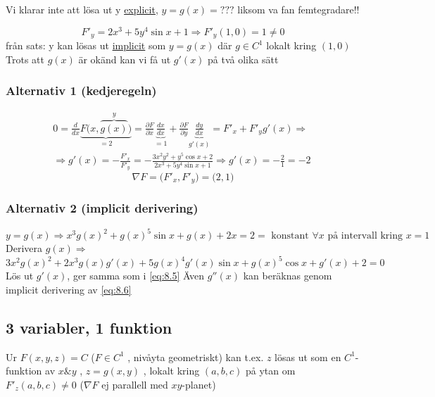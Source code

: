 \documentclass{article}
\begin{document}
Vi klarar inte att lösa ut y \underline{explicit}, \(y = g(x) = ???\) liksom va fan femtegradare!!

\[F'_y = 2x^3 + 5y^4\sin{x} + 1 \Rightarrow F'_y(1,0) = 1 \neq 0\]
från sats: y kan lösas ut \underline{implicit} som \(y = g(x)\) där \(g \in C^1\) lokalt kring \((1,0)\)
Trots att \(g(x)\) är okänd kan vi få ut \(g'(x)\) på två olika sätt

\subsubsection*{Alternativ 1 (kedjeregeln)}
\begin{equation}\label{eq:8.5}
\begin{split}
	0 = \frac{d}{dx} \underbrace{F\Big(x,\overbrace{g(x)}^y\Big)}_{=2} = \frac{\partial F}{\partial x} \underbrace{\frac{dx}{dx}}_{=1} + \frac{\partial F}{\partial y} \underbrace{\frac{dy}{dx}}_{g'(x)} = F'_x + F'_yg'(x)  \Rightarrow \\
	\Rightarrow g'(x) = - \frac{F'_x}{F'_y} = - \frac{3x^2y^2 + y^5\cos{x} + 2}{2x^3 + 5y^4\sin{x} + 1} \Rightarrow g'(x) = - \frac{2}{1} = -2 \
\end{split}
\end{equation}
\[\nabla F = \Big( F'_x,F'_y \Big) = \Big(2,1\Big)\]

\subsubsection*{Alternativ 2 (implicit derivering)}
\[
	y = g(x) \Rightarrow x^3g(x)^2 + g(x)^5\sin{x} + g(x) + 2x = 2 = \text{ konstant } \forall x \text{ på intervall kring } x = 1
\]
Derivera \(g(x) \Rightarrow\)
\begin{equation} \label{eq:8.6}
	3x^2g(x)^2 + 2x^3g(x)g'(x) + 5g(x)^4g'(x)\sin{x} + g(x)^5\cos{x} + g'(x) + 2 = 0 
\end{equation}
Lös ut \(g'(x)\), ger samma som i \eqref{eq:8.5} Även \(g''(x)\) kan beräknas genom implicit derivering av \eqref{eq:8.6}

\subsection{3 variabler, 1 funktion}

Ur \(F(x,y,z) = C\) \Big(\(F \in C^1\) , nivåyta geometriskt\Big) kan t.ex. \(z\) lösas ut som en \(C^1\)-funktion av \(x \& y\) , \(z = g(x,y)\) , 
lokalt kring \((a,b,c)\) på ytan om \(F'_z(a,b,c) \neq 0\) \Big(\(\nabla F\) ej parallell med \(xy\)-planet\Big)
\end{document}
